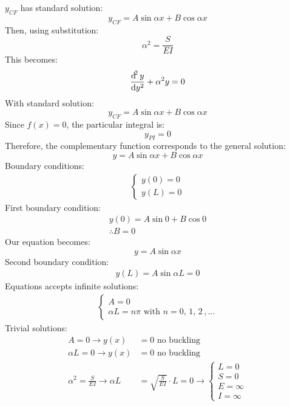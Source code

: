 $y_{CF}$ has standard solution:
\begin{equation}
  y_{CF} = A\sin{\alpha x} + B\cos{\alpha x}
\end{equation}
Then, using substitution:
\begin{equation}
  \alpha^2 = \frac{S}{EI}
\end{equation}
This becomes:
\begin{equation}
  \frac{\dif^2 y}{\dif y^2} + \alpha^2 y = 0
\end{equation}
With standard solution:
\begin{equation}
  y_{CF} = A\sin{\alpha x} + B\cos{\alpha x}
\end{equation}
Since $f(x) = 0$, the particular integral is:
\begin{equation}
  y_{PI} = 0
\end{equation}
Therefore, the complementary function corresponds to the general solution:
\begin{equation}
  y = A\sin{\alpha x} + B\cos{\alpha x}
\end{equation}
Boundary conditions:
\begin{gather}
  \begin{cases}
    y(0) = 0 \\
    y(L) = 0
  \end{cases}
\end{gather}
First boundary condition:
\begin{gather}
  y(0) = A\sin 0 + B\cos 0\\
  \therefore B = 0
\end{gather}
Our equation becomes:
\begin{equation}
  y = A\sin{\alpha x}
\end{equation}
Second boundary condition:
\begin{gather}
  y(L) = A\sin{\alpha L} = 0
\end{gather}
Equations accepts infinite solutions:
\begin{align}
  \begin{cases}
    A = 0 \\
    \alpha L = n\pi \textrm{ with } n = 0,\, 1 ,\, 2\, , ...
  \end{cases}
\end{align}
Trivial solutions:
\begin{align}
  A = 0 \rightarrow y(x)                       & = 0 \textrm{ no buckling}                                               \\
  \alpha L = 0 \rightarrow y(x)                & = 0 \textrm{ no buckling}                                               \\
  \alpha^2 = \frac{S}{EI} \rightarrow \alpha L & = \sqrt{\frac{S}{EI}}\cdot L = 0 \rightarrow \begin{cases}
    L = 0      \\
    S = 0      \\
    E = \infty \\
    I = \infty
  \end{cases}
\end{align}
